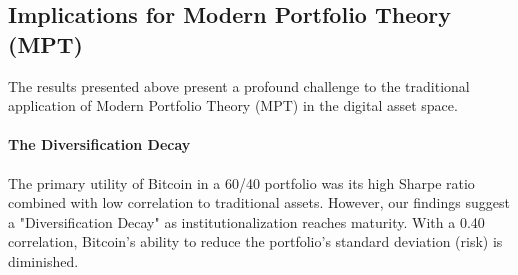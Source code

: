 \documentclass[10pt, conference, compsocconf]{IEEEtran}
\begin{document}


\subsection{Implications for Modern Portfolio Theory (MPT)}

The results presented above present a profound challenge to the traditional application of Modern Portfolio Theory (MPT) in the digital asset space.

\paragraph{The Diversification Decay}
The primary utility of Bitcoin in a 60/40 portfolio was its high Sharpe ratio combined with low correlation to traditional assets. However, our findings suggest a "Diversification Decay" as institutionalization reaches maturity. With a 0.40 correlation, Bitcoin’s ability to reduce the portfolio's standard deviation (risk) is diminished. 
\end{document}
